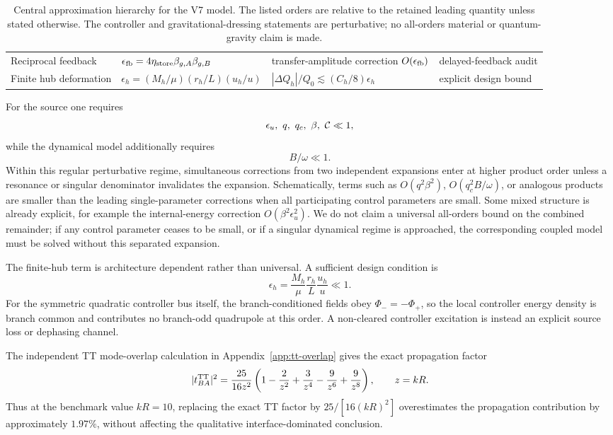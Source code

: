\begin{table}[H]
\begin{tabular}{p{}p{}p{}p{}}
Reciprocal feedback
& $\epsilon_{\rm fb}=4\eta_{\rm store}\beta_{g,A}\beta_{g,B}$
& transfer-amplitude correction $O(\epsilon_{\rm fb})$
& delayed-feedback audit \\

Finite hub deformation
& $\epsilon_h=(M_h/\mu)(r_h/L)(u_h/u)$
& $|\Delta Q_h|/Q_0\lesssim(C_h/8)\epsilon_h$
& explicit design bound \\
\bottomrule
\end{tabular}
\caption{Central approximation hierarchy for the V7 model. The listed orders are relative to the retained leading quantity unless stated otherwise. The controller and gravitational-dressing statements are perturbative; no all-orders material or quantum-gravity claim is made.}
\label{tab:error-budget}
\end{table}

For the source one requires
\begin{equation}
\epsilon_u,\ q,\ q_c,\ \beta,\ \Ccal\ll1,
\end{equation}
while the dynamical model additionally requires
\begin{equation}
B/\omega\ll1.
\end{equation}
Within this regular perturbative regime, simultaneous corrections from two independent expansions enter at higher product order unless a resonance or singular denominator invalidates the expansion. Schematically, terms such as $O(q^2\beta^2)$, $O(q_c^2 B/\omega)$, or analogous products are smaller than the leading single-parameter corrections when all participating control parameters are small. Some mixed structure is already explicit, for example the internal-energy correction $O(\beta^2\epsilon_u^2)$. We do not claim a universal all-orders bound on the combined remainder; if any control parameter ceases to be small, or if a singular dynamical regime is approached, the corresponding coupled model must be solved without this separated expansion.

The finite-hub term is architecture dependent rather than universal. A sufficient design condition is
\begin{equation}
\boxed{
\epsilon_h
=\frac{M_h}{\mu}
\frac{r_h}{L}
\frac{u_h}{u}
\ll1.}
\label{eq:hub-design}
\end{equation}
For the symmetric quadratic controller bus itself, the branch-conditioned fields obey $\Phi_-=-\Phi_+$, so the local controller energy density is branch common and contributes no branch-odd quadrupole at this order. A non-cleared controller excitation is instead an explicit source loss or dephasing channel.

The independent TT mode-overlap calculation in Appendix~\ref{app:tt-overlap} gives the exact propagation factor
\begin{equation}
|t_{BA}^{\rm TT}|^2
=\frac{25}{16z^2}
\left(1-\frac{2}{z^2}+\frac{3}{z^4}-\frac{9}{z^6}+\frac{9}{z^8}\right),
\qquad z=kR.
\label{eq:exact-prop-prob}
\end{equation}
Thus at the benchmark value $kR=10$, replacing the exact TT factor by $25/[16(kR)^2]$ overestimates the propagation contribution by approximately $1.97\%$, without affecting the qualitative interface-dominated conclusion.